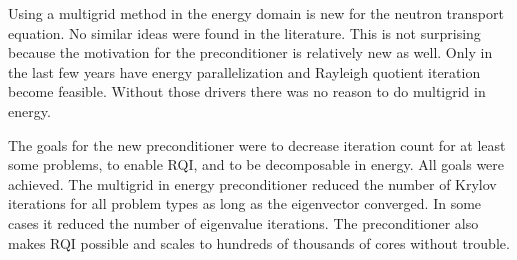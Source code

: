 Using a multigrid method in the energy domain is new for the neutron transport equation. No similar ideas were found in the literature. This is not surprising because the motivation for the preconditioner is relatively new as well. Only in the last few years have energy parallelization and Rayleigh quotient iteration become feasible. Without those drivers there was no reason to do multigrid in energy. 

The goals for the new preconditioner were to decrease iteration count for at least some problems, to enable RQI, and to be decomposable in energy. All goals were achieved. The multigrid in energy preconditioner reduced the number of Krylov iterations for all problem types as long as the eigenvector converged. In some cases it reduced the number of eigenvalue iterations. The preconditioner also makes RQI possible and scales to hundreds of thousands of cores without trouble. 



\separatorpage{}








